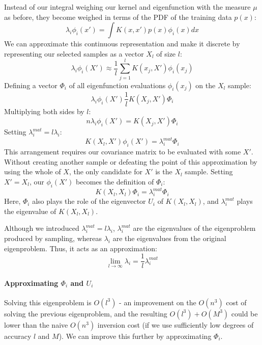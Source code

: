 Instead of our integral weighing our kernel and eigenfunction with the measure $\mu$ as before, they become weighed in terms of the PDF of the training data $p(x)$:
\begin{equation*}
    \lambda_i \phi_i(x') = \int K(x, x') p(x) \phi_i(x) dx
\end{equation*}
We can approximate this continuous representation and make it discrete by representing our selected samples as a vector $X_l$ of size $l$:
\begin{equation*}
    \lambda_i \phi_i(X') \approx \frac{1}{l} \sum_{j=1}^{l} K(x_j, X') \phi_i(x_j)
\end{equation*}
Defining a vector $\Phi_i$ of all eigenfunction evaluations $\phi_i(x_j)$ on the $X_l$ sample:
\begin{equation*}
    \lambda_i \phi_i(X') \frac{1}{l} K(X_j, X') \Phi_i
\end{equation*}
Multiplying both sides by $l$:
\begin{equation*}
    n \lambda_i \phi_i(X') = K(X_j, X') \Phi_i
\end{equation*}
Setting $\lambda_i^{mat} = l \lambda_i$:
\begin{equation*}
    K(X_l, X') \phi_i(X') = \lambda_i^{mat} \Phi_i
\end{equation*}
This arrangement requires our covariance matrix to be evaluated with some $X'$. Without creating another sample or defeating the point of this approximation by using the whole of $X$, the only candidate for $X'$ is the $X_l$ sample. Setting $X' = X_l$, our $\phi_i(X')$ becomes the definition of $\Phi_i$:
\begin{equation*}
    K(X_l, X_l) \Phi_i = \lambda_i^{mat} \Phi_i
\end{equation*}
Here, $\Phi_i$ also plays the role of the eigenvector $U_i$ of $K(X_l, X_l)$, and $\lambda_i^{mat}$ plays the eigenvalue of $K(X_l, X_l)$. 

Although we introduced $\lambda_i^{mat} = l \lambda_i$, $\lambda_i^{mat}$ are the eigenvalues of the eigenproblem produced by sampling, whereas $\lambda_i$ are the eigenvalues from the original eigenproblem. Thus, it acts as an approximation:
\begin{equation*}
    \lim_{l \to \infty} \lambda_i = \frac{1}{l} \lambda_i^{mat} 
\end{equation*}

\paragraph{Approximating $\Phi_i$ and $U_i$}
Solving this eigenproblem is $O(l^3)$ - an improvement on the $O(n^3)$ cost of solving the previous eigenproblem, and the resulting $O(l^3) + O(M^3)$ could be lower than the naive $O(n^3)$ inversion cost (if we use sufficiently low degrees of accuracy $l$ and $M$). We can improve this further by approximating $\Phi_i$.


